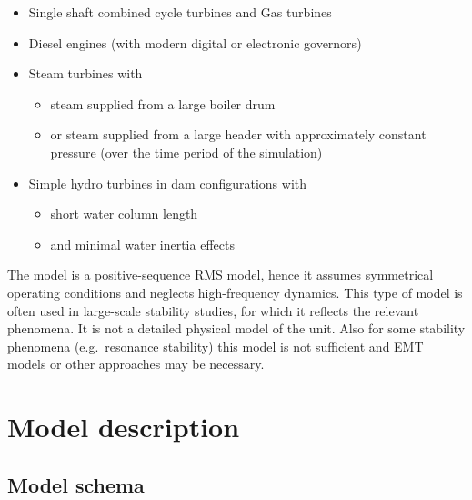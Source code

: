 \documentclass[
  a4paper,
  DIV=11,
  numbers=noendperiod]{scrartcl}
\providecommand{\tightlist}{%
  \setlength{\itemsep}{0pt}\setlength{\parskip}{0pt}}\usepackage{longtable,booktabs,array}
\begin{document}
\begin{itemize}
\tightlist
\item
  Single shaft combined cycle turbines and Gas turbines
\item
  Diesel engines (with modern digital or electronic governors)
\item
  Steam turbines with

  \begin{itemize}
  \tightlist
  \item
    steam supplied from a large boiler drum
  \item
    or steam supplied from a large header with approximately constant
    pressure (over the time period of the simulation)
  \end{itemize}
\item
  Simple hydro turbines in dam configurations with

  \begin{itemize}
  \tightlist
  \item
    short water column length
  \item
    and minimal water inertia effects
  \end{itemize}
\end{itemize}

The model is a positive-sequence RMS model, hence it assumes symmetrical
operating conditions and neglects high-frequency dynamics. This type of
model is often used in large-scale stability studies, for which it
reflects the relevant phenomena. It is not a detailed physical model of
the unit. Also for some stability phenomena (e.g.~resonance stability)
this model is not sufficient and EMT models or other approaches may be
necessary.

\section{Model description}\label{model-description}

\subsection{Model schema}\label{model-schema}
\end{document}
